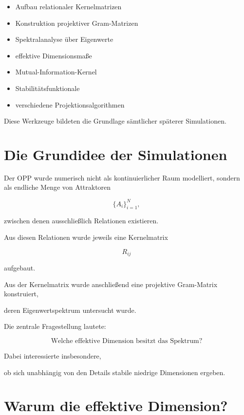 \begin{itemize}

\item Aufbau relationaler Kernelmatrizen

\item Konstruktion projektiver Gram-Matrizen

\item Spektralanalyse über Eigenwerte

\item effektive Dimensionsmaße

\item Mutual-Information-Kernel

\item Stabilitätsfunktionale

\item verschiedene Projektionsalgorithmen

\end{itemize}

Diese Werkzeuge bildeten die Grundlage sämtlicher späterer Simulationen.

\section*{Die Grundidee der Simulationen}

Der OPP wurde numerisch nicht als kontinuierlicher Raum modelliert, sondern als endliche Menge von Attraktoren

\[
\{A_i\}_{i=1}^{N},
\]

zwischen denen ausschließlich Relationen existieren.

Aus diesen Relationen wurde jeweils eine Kernelmatrix

\[
R_{ij}
\]

aufgebaut.

Aus der Kernelmatrix wurde anschließend eine projektive Gram-Matrix konstruiert,

deren Eigenwertspektrum untersucht wurde.

Die zentrale Fragestellung lautete:

\[
\boxed{
\text{Welche effektive Dimension besitzt das Spektrum?}
}
\]

Dabei interessierte insbesondere,

ob sich unabhängig von den Details stabile niedrige Dimensionen ergeben.

\section*{Warum die effektive Dimension?}

